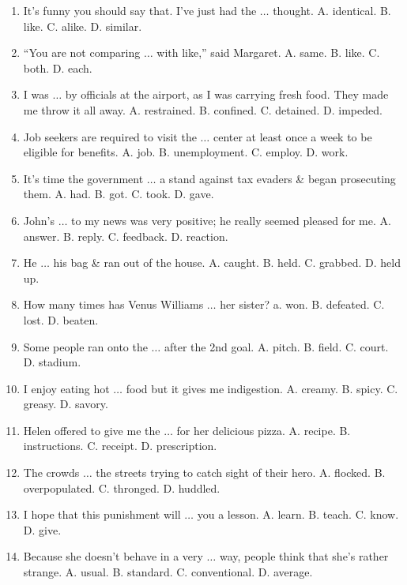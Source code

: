 \documentclass{article}
\numberwithin{equation}{section}
\begin{document}
\begin{enumerate}[leftmargin=8mm]
	\item It's funny you should say that. I've just had the $\ldots$ thought. {\sf A.} identical. {\sf B.} like. {\sf C.} alike. {\sf D.} similar.
	\item ``You are not comparing $\ldots$ with like,'' said Margaret. {\sf A.} same. {\sf B.} like. {\sf C.} both. {\sf D.} each.
	\item I was $\ldots$ by officials at the airport, as I was carrying fresh food. They made me throw it all away. {\sf A.} restrained. {\sf B.} confined. {\sf C.} detained. {\sf D.} impeded.
	\item Job seekers are required to visit the $\ldots$ center at least once a week to be eligible for benefits. {\sf A.} job. {\sf B.} unemployment. {\sf C.} employ. {\sf D.} work.
	\item It's time the government $\ldots$ a stand against tax evaders \& began prosecuting them. {\sf A.} had. {\sf B.} got. {\sf C.} took. {\sf D.} gave.
	\item John's $\ldots$ to my news was very positive; he really seemed pleased for me. {\sf A.} answer. {\sf B.} reply. {\sf C.} feedback. {\sf D.} reaction.
	\item He $\ldots$ his bag \& ran out of the house. {\sf A.} caught. {\sf B.} held. {\sf C.} grabbed. {\sf D.} held up.
	\item How many times has Venus Williams $\ldots$ her sister? a. won. {\sf B.} defeated. {\sf C.} lost. {\sf D.} beaten.
	\item Some people ran onto the $\ldots$ after the 2nd goal. {\sf A.} pitch. {\sf B.} field. {\sf C.} court. {\sf D.} stadium.
	\item I enjoy eating hot $\ldots$ food but it gives me indigestion. {\sf A.} creamy. {\sf B.} spicy. {\sf C.} greasy. {\sf D.} savory.
	\item Helen offered to give me the $\ldots$ for her delicious pizza. {\sf A.} recipe. {\sf B.} instructions. {\sf C.} receipt. {\sf D.} prescription.
	\item The crowds $\ldots$ the streets trying to catch sight of their hero. {\sf A.} flocked. {\sf B.} overpopulated. {\sf C.} thronged. {\sf D.} huddled.
	\item I hope that this punishment will $\ldots$ you a lesson. {\sf A.} learn. {\sf B.} teach. {\sf C.} know. {\sf D.} give.
	\item Because she doesn't behave in a very $\ldots$ way, people think that she's rather strange. {\sf A.} usual. {\sf B.} standard. {\sf C.} conventional. {\sf D.} average.

\end{enumerate}
\end{document}
